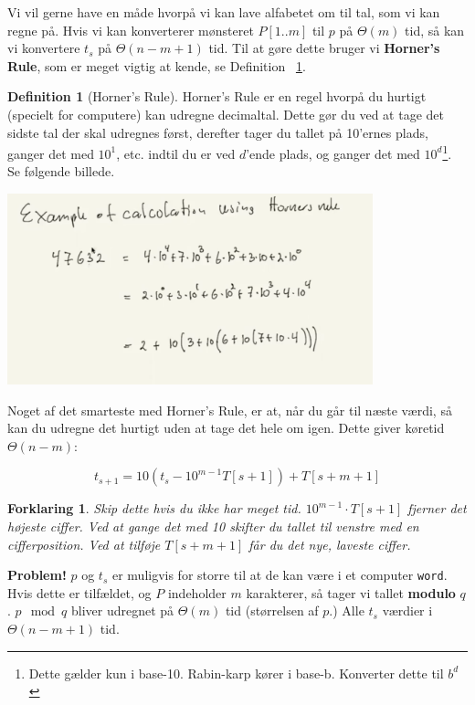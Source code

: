 \documentclass[11pt]{article}
\newtheorem{forklaring}[theorem]{Forklaring}
\theoremstyle{definition}
\newtheorem{definition}{Definition}
\theoremstyle{remark}
\begin{document}
Vi vil gerne have en måde hvorpå vi kan lave alfabetet om til tal, som vi kan regne på. Hvis vi kan konverterer mønsteret $P[1..m]$ til $p$ på $\Theta(m)$ tid, så kan vi konvertere $t_{s}$ på $\Theta(n-m+1)$ tid. Til at gøre dette bruger vi \textbf{Horner's Rule}, som er meget vigtig at kende, se Definition ~\ref{def:horner}.

\begin{definition}[Horner's Rule]
  \label{def:horner}
  Horner's Rule er en regel hvorpå du hurtigt (specielt for computere) kan udregne decimaltal. Dette gør du ved at tage det sidste tal der skal udregnes først, derefter tager du tallet på 10'ernes plads, ganger det med $10^{1}$, etc. indtil du er ved $d$'ende plads, og ganger det med $10^{d}$\footnote{Dette gælder kun i base-10. Rabin-karp kører i base-b. Konverter dette til $b^{d}$}. Se følgende billede.


    \includegraphics[width=300pt]{../Question8/main--the-naive-string-matching-algorithm--rabin-karp-c553.png} 
\end{definition}

Noget af det smarteste med Horner's Rule, er at, når du går til næste værdi, så kan du udregne det hurtigt uden at tage det hele om igen. Dette giver køretid $\Theta(n-m)$:

\[ t_{s+1} = 10(t_{s} - 10^{m-1}T[s+1]) + T[s+m+1] \]


\begin{forklaring}
\textit{Skip dette hvis du ikke har meget tid.} $10^{m-1} \cdot T[s+1]$ fjerner det højeste ciffer. Ved at gange det med 10 skifter du tallet til venstre med en cifferposition. Ved at tilføje $T[s+m+1]$ får du det nye, laveste ciffer. 
\end{forklaring}

\textbf{Problem!} $p$ og $t_{s}$ er muligvis for storre til at de kan være i et computer \texttt{word}. Hvis dette er tilfældet, og $P$ indeholder $m$ karakterer, så tager vi tallet \textbf{modulo }$q$. $p \mod q$ bliver udregnet på $\Theta(m)$ tid (størrelsen af $p$.) Alle $t_{s}$ værdier i $\Theta(n-m+1)$ tid.
\end{document}
